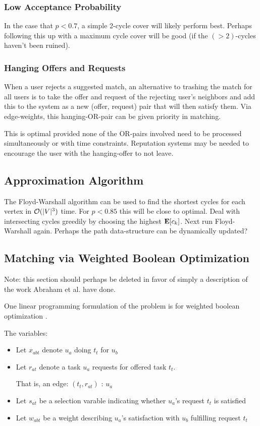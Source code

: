 \documentclass[main.tex]{subfiles}
\begin{document}
\subsubsection{Low Acceptance Probability}
In the case that $p < 0.7$, a simple 2-cycle cover will likely perform best. Perhaps following this up with a maximum cycle cover will be good (if the $(>2)$-cycles haven't been ruined).

\subsubsection{Hanging Offers and Requests}
When a user rejects a suggested match, an alternative to trashing the match for all users is to take the offer and request of the rejecting user's neighbors and add this to the system as a new (offer, request) pair that will then satisfy them. Via edge-weights, this hanging-OR-pair can be given priority in matching.

This is optimal provided none of the OR-pairs involved need to be processed simultaneously or with time constraints. Reputation systems may be needed to encourage the user with the hanging-offer to not leave.

\subsection{Approximation Algorithm}

The Floyd-Warshall algorithm can be used to find the shortest cycles for each vertex in $\mathcal{O}(|V|^3)$ time. For $p < 0.85$ this will be close to optimal. Deal with intersecting cycles greedily by choosing the highest $\mathbf{E}[c_k]$. Next run Floyd-Warshall again. Perhaps the path data-structure can be dynamically updated?

\subsection{Matching via Weighted Boolean Optimization}
Note: this section should perhaps be deleted in favor of simply a description of the work Abraham et al. \cite{Abr1} have done.


One linear programming formulation of the problem is for weighted boolean optimization \cite{Mar1}.

The variables:
\begin{itemize}
  \item Let $x_{abt}$ denote $u_a$ doing $t_t$ for $u_b$
  \item Let $r_{at}$ denote a task $u_a$ requests for offered task $t_t$.

        That is, an edge: $(t_t, r_{at})$ : $u_a$
  \item Let $s_{at}$ be a selection varable indicating whether $u_a$'s request $t_t$ is satisfied
  \item Let $w_{abt}$ be a weight describing $u_a$'s satisfaction with $u_b$ fulfilling request $t_t$
\end{itemize}
\end{document}
